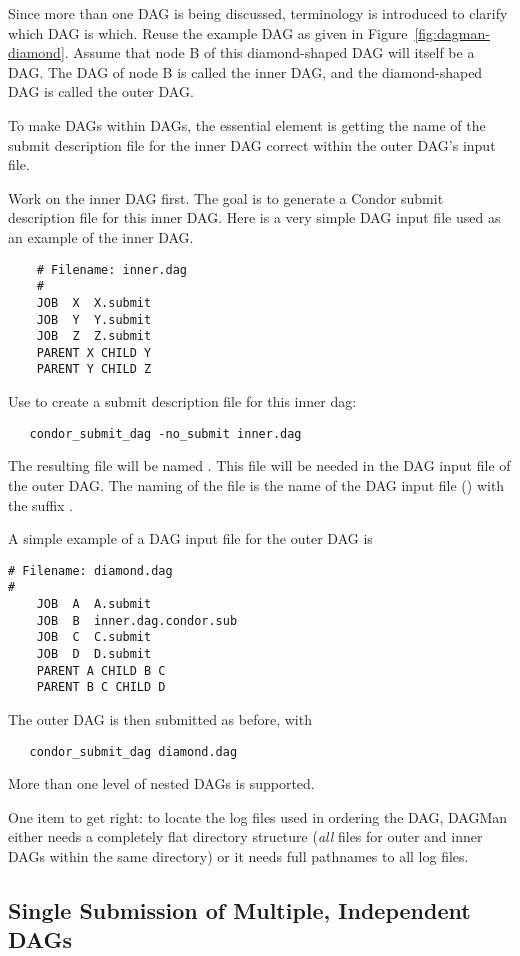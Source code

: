Since more than one DAG is being discussed, 
terminology is introduced to clarify which DAG is which. 
Reuse the example DAG as given in 
Figure~\ref{fig:dagman-diamond}.
Assume that node B of this diamond-shaped DAG
will itself be a DAG.
The DAG of node B is called the inner DAG,
and the diamond-shaped DAG is called the outer DAG.

To make DAGs within DAGs,
the essential element is getting the name of the submit description
file for the inner DAG correct within the outer DAG's input
file.

Work on the inner DAG first.
The goal is to generate a Condor submit description file for this inner DAG.
Here is a very simple DAG input file used as an example of the inner DAG.
\begin{verbatim}
    # Filename: inner.dag
    #
    JOB  X  X.submit
    JOB  Y  Y.submit
    JOB  Z  Z.submit
    PARENT X CHILD Y
    PARENT Y CHILD Z
\end{verbatim}

Use  to create a submit description file for this
inner dag:
\begin{verbatim}
   condor_submit_dag -no_submit inner.dag
\end{verbatim}
The resulting file will be named .
This file will be needed in the DAG input file of the outer DAG.
The naming of the file is the name of the DAG input file
() with the suffix .

A simple example of a DAG input file for the outer DAG is
\begin{verbatim}
# Filename: diamond.dag
#
    JOB  A  A.submit 
    JOB  B  inner.dag.condor.sub
    JOB  C  C.submit	
    JOB  D  D.submit
    PARENT A CHILD B C
    PARENT B C CHILD D
\end{verbatim}

The outer DAG is then submitted as before, with
\begin{verbatim}
   condor_submit_dag diamond.dag
\end{verbatim}

More than one level of nested DAGs is supported.

One item to get right:
to locate the log files used in ordering the DAG,
DAGMan either needs a completely flat directory structure
(\emph{all} files for outer and inner DAGs within the same directory)
or
it needs full pathnames to all log files.

\subsection{\label{sec:MultipleDAGs}Single Submission of Multiple, Independent DAGs}

